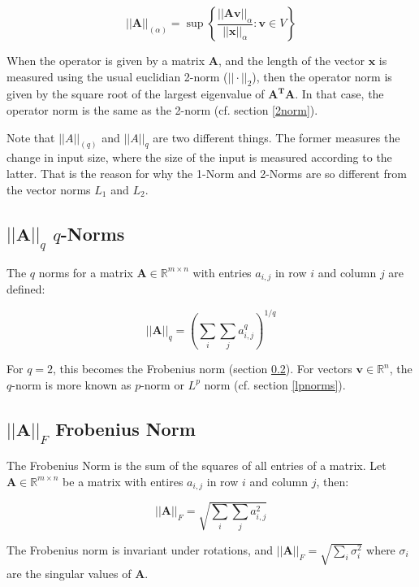 \begin{equation}
||\mathbf{A}||_{(\alpha)} = \sup\left\{\frac{||\mathbf{A}\mathbf{v}||_{\alpha}}{||\mathbf{x}||_{\alpha}}: \mathbf{v} \in V\right\}
\end{equation}

When the operator is given by a matrix $\mathbf{A}$, and the length of the vector $\mathbf{x}$ is measured using the usual euclidian 2-norm ($||\cdot||_{2}$), then the operator norm is given by the square root of the largest eigenvalue of $\mathbf{A^T A}$. In that case, the operator norm is the same as the 2-norm (cf. section \ref{2norm}).

Note that $||A||_{(q)}$ and $||A||_q$ are two different things. The former measures the change in input size, where the size of the input is measured according to the latter. That is the reason for why the 1-Norm and 2-Norms are so different from the vector norms $L_1$ and $L_2$.


\subsection{$||\mathbf{A}||_q$ $q$-Norms}
\label{qnorms}

The $q$ norms for a matrix $\mathbf{A} \in \mathbb{R}^{m\times n}$ with entries $a_{i,j}$ in row $i$ and column $j$ are defined:

\begin{equation}
||\mathbf{A}||_q = \left(\sum_{i}\sum_{j} a^q_{i,j}\right)^{1/q}
\end{equation}

For $q=2$, this becomes the Frobenius norm (section \ref{sec:frobenius}). For vectors $\mathbf{v}\in\mathbb{R}^{n}$, the $q$-norm is more known as $p$-norm or $L^p$ norm (cf. section \ref{lpnorms}). 

\subsection{$||\mathbf{A}||_F$ Frobenius Norm}
\label{sec:frobenius}
The Frobenius Norm is the sum of the squares of all entries of a matrix. Let $\mathbf{A} \in \mathbb{R}^{m\times n}$ be a matrix with entires $a_{i,j}$ in row $i$ and column $j$, then:

\begin{equation}
||\mathbf{A}||_F = \sqrt{\sum_{i}\sum_{j} a^2_{i,j}}
\end{equation}

The Frobenius norm is invariant under rotations, and $||\mathbf{A}||_F = \sqrt{\sum_i \sigma_i^2}$ where $\sigma_i$ are the singular values of $\mathbf{A}$. 


